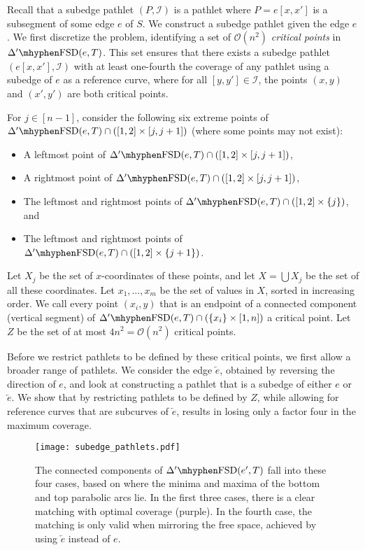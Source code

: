 \documentclass[a4paper,UKenglish,cleveref,thm-restate,notab]{lipics-v2021}
\newcommand{\FSD}[1][\Delta'] {\ensuremath{#1}\mhyphen\mathrm{FSD}}
\newcommand{\bigO}{\mathcal{O}}
\newcommand{\I}{\mathcal{I}}
\newcommand{\rev}{\overleftarrow}
\begin{document}
    Recall that a subedge pathlet $(P, \I)$ is a pathlet where $P = e[x, x']$ is a subsegment of some edge $e$ of $S$.
    We construct a subedge pathlet given the edge $e$.
    We first discretize the problem, identifying a set of $\bigO(n^2)$ \emph{critical points} in $\FSD(e, T)$.
    This set ensures that there exists a subedge pathlet $(e[x, x'], \I)$ with at least one-fourth the coverage of any pathlet using a subedge of $e$ as a reference curve, where for all $[y, y'] \in \I$, the points $(x, y)$ and $(x', y')$ are both critical points.

    For $j \in [n-1]$, consider the following six extreme points of $\FSD(e, T) \cap ([1, 2] \times [j, j+1])$ (where some points may not exist):
    \begin{itemize}
        \item A leftmost point of $\FSD(e, T) \cap ([1, 2] \times [j, j+1])$,
        \item A rightmost point of $\FSD(e, T) \cap ([1, 2] \times [j, j+1])$,
        \item The leftmost and rightmost points of $\FSD(e, T) \cap ([1, 2] \times \{j\})$, and
        \item The leftmost and rightmost points of $\FSD(e, T) \cap ([1, 2] \times \{j+1\})$.
    \end{itemize}
    Let $X_j$ be the set of $x$-coordinates of these points, and let $X = \bigcup X_j$ be the set of all these coordinates.
    Let $x_1, \dots, x_m$ be the set of values in $X$, sorted in increasing order.
    We call every point $(x_i, y)$ that is an endpoint of a connected component (vertical segment) of $\FSD(e, T) \cap (\{x_i\} \times [1, n])$ a critical point.
    Let $Z$ be the set of at most $4n^2 = \bigO(n^2)$ critical points.

    Before we restrict pathlets to be defined by these critical points, we first allow a broader range of pathlets.
    We consider the edge $\rev{e}$, obtained by reversing the direction of $e$, and look at constructing a pathlet that is a subedge of either $e$ or $\rev{e}$.
    We show that by restricting pathlets to be defined by $Z$, while allowing for reference curves that are subcurves of $\rev{e}$, results in losing only a factor four in the maximum coverage.
    
    \begin{figure}
        \centering
        \texttt{[image: subedge\_pathlets.pdf]}
        \caption{The connected components of $\FSD(e', T)$ fall into these four cases, based on where the minima and maxima of the bottom and top parabolic arcs lie.
        In the first three cases, there is a clear matching with optimal coverage (purple).
        In the fourth case, the matching is only valid when mirroring the free space, achieved by using $\rev{e}$ instead of $e$.}
        \label{fig:subedge_pathlets}
    \end{figure}
\end{document}
